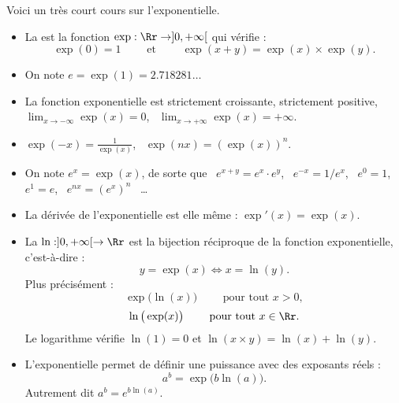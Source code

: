 \documentclass[11pt,class=report,crop=false]{standalone}
\begin{document}






\bigskip




\begin{cours}
Voici un très court cours sur l'exponentielle.
\begin{itemize}
  \item La  est la fonction $\exp : \Rr \to ]0,+\infty[$ qui vérifie :
  $$\exp(0) = 1 \qquad \text{ et } \qquad \exp(x+y) = \exp(x) \times \exp(y).$$ 
  
  \item On note $e = \exp(1) = 2.718281\ldots$
  
  \item La fonction exponentielle est strictement croissante, strictement positive,
  $\lim_{x\to-\infty} \exp(x) = 0$, \ $\lim_{x\to+\infty} \exp(x) = +\infty$.
  
  \item $\exp(-x) = \frac{1}{\exp(x)}$, \ $\exp(nx) = (\exp(x))^n$.
  
  \item On note $e^x = \exp(x)$, de sorte que \ $e^{x+y} = e^x \cdot e^y$, \ $e^{-x} = 1/e^x$, \ $e^0=1$, \ $e^1=e$, \ $e^{nx} = (e^x)^n$ \ \ldots
  
  \item La dérivée de l’exponentielle est elle même : $\exp'(x) = \exp(x)$.
  
  \item La  $\ln : ]0,+\infty[ \to \Rr$ est la bijection réciproque de la fonction exponentielle, c'est-à-dire :
  $$y = \exp(x) \iff x = \ln(y).$$
  Plus précisément :
  $$\exp\big(\ln(x) \big) \qquad \text{ pour tout } x >0,$$
  $$\ln\big(\exp(x) \big) \qquad \text{ pour tout } x \in \Rr.$$
  Le logarithme vérifie $\ln(1)=0$ et $\ln(x\times y) = \ln(x)+\ln(y)$.
    
  \item L'exponentielle permet de définir une puissance avec des exposants réels :  
 $$a^b = \exp\big(b \ln(a) \big).$$
 Autrement dit $a^b = e^{b\ln(a)}$.
  \end{itemize}

\end{cours}
\end{document}
